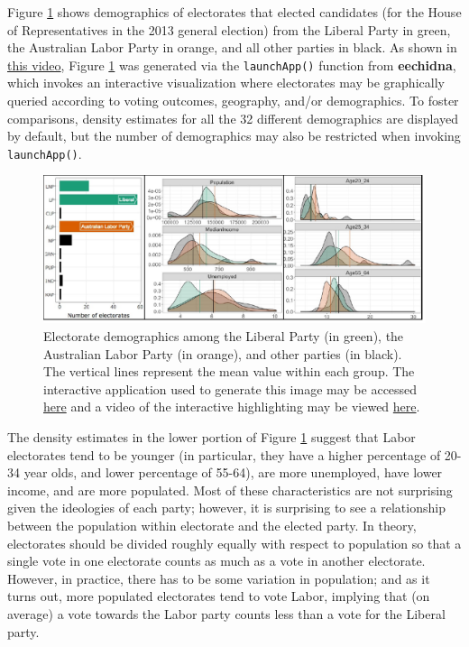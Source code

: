 \documentclass[12pt,]{article}
\theoremstyle{definition}
\theoremstyle{definition}
\theoremstyle{remark}
\begin{document}
Figure \ref{fig:eechidna-2p} shows demographics of electorates that
elected candidates (for the House of Representatives in the 2013 general
election) from the Liberal Party in green, the Australian Labor Party in
orange, and all other parties in black. As shown in
\href{https://vimeo.com/191553616}{this video}, Figure
\ref{fig:eechidna-2p} was generated via the \texttt{launchApp()}
function from \textbf{eechidna}, which invokes an interactive
visualization where electorates may be graphically queried according to
voting outcomes, geography, and/or demographics. To foster comparisons,
density estimates for all the 32 different demographics are displayed by
default, but the number of demographics may also be restricted when
invoking \texttt{launchApp()}.

\begin{figure}
\centering
\includegraphics{images/eechidna-2p.pdf}
\caption{\label{fig:eechidna-2p}Electorate demographics among the Liberal
Party (in green), the Australian Labor Party (in orange), and other
parties (in black). The vertical lines represent the mean value within
each group. The interactive application used to generate this image may
be accessed \href{http://104.131.111.111:3838/eechidna/}{here} and a
video of the interactive highlighting may be viewed
\href{https://vimeo.com/191553616}{here}.}
\end{figure}

The density estimates in the lower portion of Figure
\ref{fig:eechidna-2p} suggest that Labor electorates tend to be younger
(in particular, they have a higher percentage of 20-34 year olds, and
lower percentage of 55-64), are more unemployed, have lower income, and
are more populated. Most of these characteristics are not surprising
given the ideologies of each party; however, it is surprising to see a
relationship between the population within electorate and the elected
party. In theory, electorates should be divided roughly equally with
respect to population so that a single vote in one electorate counts as
much as a vote in another electorate. However, in practice, there has to
be some variation in population; and as it turns out, more populated
electorates tend to vote Labor, implying that (on average) a vote
towards the Labor party counts less than a vote for the Liberal party.
\end{document}
